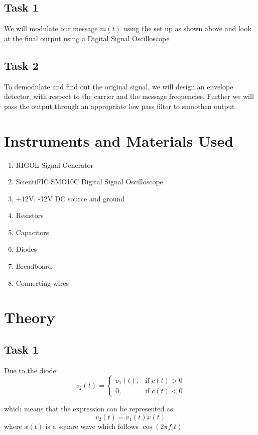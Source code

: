 \documentclass{article}
\begin{document}
\subsection{Task 1}
We will modulate our message $m(t)$ using the set up as shown above and look at the final output using a Digital Signal Oscilloscope

\subsection{Task 2}
To demodulate and find out the original signal, we will design an envelope detector, with respect to the carrier and the message frequencies. Further we will pass the output through an appropriate low pass filter to smoothen output 

\section{Instruments and Materials Used}
\begin{enumerate}
  \item RIGOL Signal Generator
  \item ScientiFIC SMO10C Digital Signal Oscilloscope
  \item +12V, -12V DC source and ground
  \item Resistors
  \item Capacitors
  \item Diodes
  \item Breadboard
  \item Connecting wires
\end{enumerate}

\section{Theory}
\subsection{Task 1}
Due to the diode:
\begin{equation}
    v_2(t)=\begin{cases}
        v_1(t),& \text{if } c(t) > 0\\
        0, & \text{if } c(t) < 0
    \end{cases}
\end{equation}


which means that the expression can be represented as:
\begin{equation}
    v_2(t)=v_1(t)x(t)
\end{equation}
where $x(t)$ is a square wave which follows $\cos(2\pi f_c t)$
\end{document}
